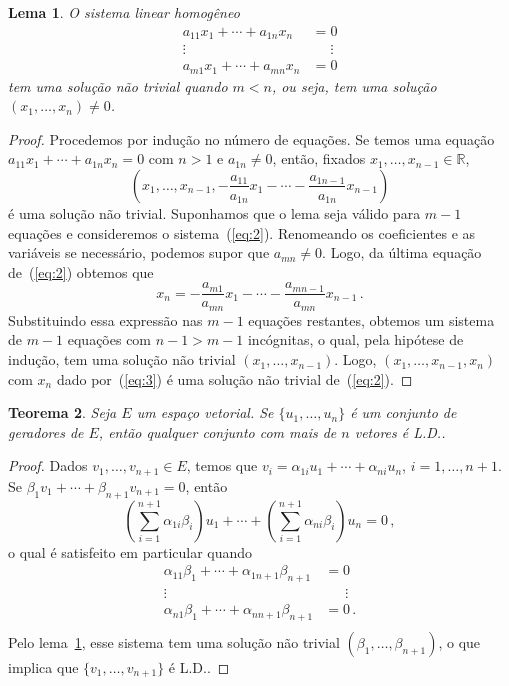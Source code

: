 \documentclass[12pt,a4paper]{article}
\newcommand{\dpar}[1]{\left(#1\right)}
\newcommand{\R}{\mathbb{R}}
\newtheorem{thm}{Teorema}[section]
\newtheorem{lem}[thm]{Lema}
\theoremstyle{definition}
\begin{document}
\begin{lem}
  \label{thm:3}
  O sistema linear homogêneo
  \begin{equation}
    \label{eq:2}
    \begin{split}
      a_{11}x_1+\cdots+a_{1n}x_n&=0\\
      \vdots\qquad\qquad&\quad\,\,\vdots\\
      a_{m1}x_1+\cdots+a_{mn}x_n&=0
    \end{split}
  \end{equation}
  tem uma solução não trivial quando $m<n$, ou seja, tem uma solução
  $(x_1,\ldots,x_n)\ne 0$.
\end{lem}
\begin{proof}
  Procedemos por indução no número de equações. Se temos uma equação
  $a_{11}x_1+\cdots+a_{1n}x_n=0$ com $n>1$ e $a_{1n}\ne 0$, então,
  fixados $x_1,\ldots,x_{n-1}\in\R$,
  $$\dpar{x_1,\ldots,x_{n-1},-\frac{a_{11}}{a_{1n}}x_1-\cdots-\frac{a_{1n-1}}{a_{1n}}x_{n-1}}$$
  é uma solução não trivial. Suponhamos que o lema seja válido para
  $m-1$ equações e consideremos o sistema~(\ref{eq:2}). Renomeando os
  coeficientes e as variáveis se necessário, podemos supor que
  $a_{mn}\ne 0$. Logo, da última equação de~(\ref{eq:2}) obtemos que
  \begin{equation}
    \label{eq:3}
    x_n=-\frac{a_{m1}}{a_{mn}}x_1-\cdots-\frac{a_{mn-1}}{a_{mn}}x_{n-1}\,.
  \end{equation}
  Substituindo essa expressão nas $m-1$ equações restantes, obtemos um
  sistema de $m-1$ equações com $n-1>m-1$ incógnitas, o qual, pela
  hipótese de indução, tem uma solução não trivial
  $(x_1,\ldots, x_{n-1})$. Logo, $(x_1,\ldots,x_{n-1},x_n)$ com $x_n$
  dado por~(\ref{eq:3}) é uma solução não trivial de~(\ref{eq:2}).
\end{proof}

\begin{thm}
  Seja $E$ um espaço vetorial. Se $\{u_1,\ldots,u_n\}$ é um conjunto
  de geradores de $E$, então qualquer conjunto com mais de $n$ vetores
  é L.D..
\end{thm}
\begin{proof}
  Dados $v_1,\ldots,v_{n+1}\in E$, temos que
  $v_i=\alpha_{1i}u_1+\cdots+\alpha_{ni}u_n$, $i=1,\ldots,n+1$. Se
  $\beta_1v_1+\cdots+\beta_{n+1}v_{n+1}=0$, então
  $$\dpar{\sum_{i=1}^{n+1}\alpha_{1i}\beta_i}u_1+\cdots+\dpar{\sum_{i=1}^{n+1}\alpha_{ni}\beta_i}u_n=0\,,$$
  o qual é satisfeito em particular quando
  \begin{equation*}
    \begin{split}
      \alpha_{11}\beta_1+\cdots+\alpha_{1n+1}\beta_{n+1}&=0\\
      \vdots\qquad\qquad&\quad\,\,\,\vdots\\
      \alpha_{n1}\beta_1+\cdots+\alpha_{nn+1}\beta_{n+1}&=0\,.\\
    \end{split}
  \end{equation*}
  Pelo lema~\ref{thm:3}, esse sistema tem uma solução não trivial
  $(\beta_1,\ldots,\beta_{n+1})$, o que implica que
  $\{v_1,\ldots,v_{n+1}\}$ é L.D..
\end{proof}
\end{document}
